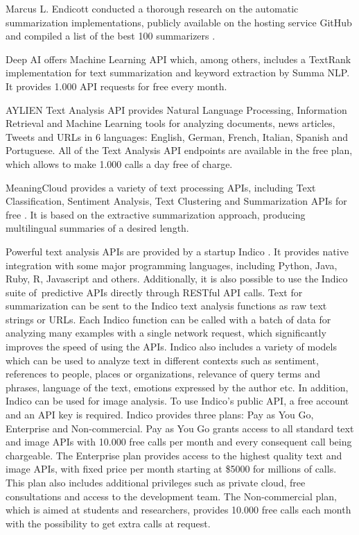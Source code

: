 \documentclass[11pt,a4paper,onecolumn]{article}
\begin{document}
Marcus L. Endicott conducted a  thorough research on the automatic summarization  implementations, publicly available on  the hosting service GitHub and compiled a list of the best 100 summarizers \cite{endicot2017Top100}.

Deep AI offers Machine Learning API \cite{deepaiapi} which, among others, includes a TextRank implementation for text summarization and keyword extraction by Summa NLP.
It provides 1.000 API requests for free every month.

AYLIEN Text Analysis API \cite{aylienapi} provides Natural Language Processing, Information Retrieval and Machine Learning tools for analyzing documents, news articles, Tweets and URLs in 6 languages: English, German, French, Italian, Spanish and Portuguese.
All of the Text Analysis API endpoints are available in the free plan, which allows to make 1.000 calls a day free of charge.

MeaningCloud provides a variety of text processing APIs, including Text Classification, Sentiment Analysis, Text Clustering and Summarization APIs for free \cite{meaaningcloud2017api}.
It is based on the extractive summarization approach, producing multilingual summaries of a desired length.

Powerful text analysis APIs are provided by a startup Indico \cite{indicoapi}.
It provides native integration with some major programming languages, including Python, Java, Ruby, R, Javascript and others.
Additionally, it is also possible to use the Indico suite of predictive APIs directly through RESTful API calls.
Text for summarization can be sent to the Indico text analysis functions as raw text strings or URLs.
Each Indico function can be called with a batch of data for analyzing many examples with a single network request, which significantly improves the speed of using the APIs.
Indico also includes a variety of models which can be used to analyze text in different contexts such as sentiment, references to people, places or organizations, relevance of query terms and phrases, language of the text, emotions expressed by the author etc.
In addition, Indico can be used for image analysis.
To use Indico's public API, a free account and an API key is required.
Indico provides three plans: Pay as You Go, Enterprise and Non-commercial.
Pay as You Go grants access to all standard text and image APIs with 10.000 free calls per month and every consequent call being chargeable.
The Enterprise plan provides access to the highest quality text and image APIs, with fixed price per month starting at \$5000 for millions of calls.
This plan also includes additional privileges such as private cloud, free consultations and access to the development team.
The Non-commercial plan, which is aimed at students and researchers, provides 10.000 free calls each month with the possibility to get extra calls at request.
\end{document}
